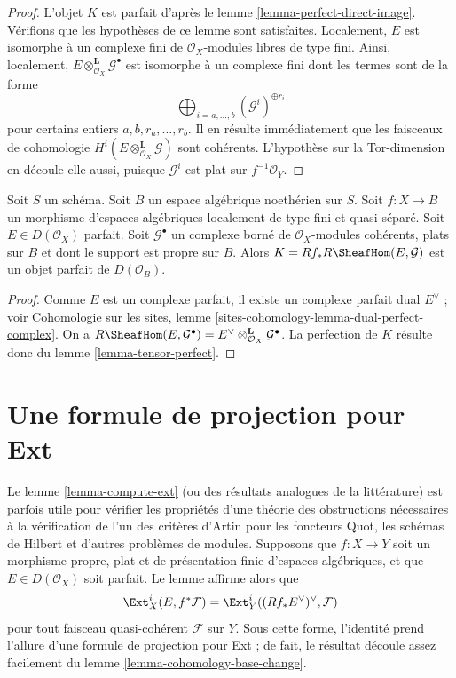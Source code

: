 \begin{proof}
L'objet $K$ est parfait d'apr\`es le lemme \ref{lemma-perfect-direct-image}.
V\'erifions que les hypoth\`eses de ce lemme sont satisfaites. Localement, $E$
est isomorphe \`a un complexe fini de $\mathcal{O}_X$-modules libres de type
fini. Ainsi, localement,
$E\otimes^\mathbf{L}_{\mathcal{O}_X}\mathcal{G}^\bullet$ est isomorphe \`a un
complexe fini dont les termes sont de la forme
$$
\bigoplus\nolimits_{i = a, \ldots, b} (\mathcal{G}^i)^{\oplus r_i}
$$
pour certains entiers $a,b,r_a,\ldots,r_b$. Il en r\'esulte imm\'ediatement que
les faisceaux de cohomologie
$H^i(E\otimes^\mathbf{L}_{\mathcal{O}_X}\mathcal{G})$ sont coh\'erents.
L'hypoth\`ese sur la Tor-dimension en d\'ecoule elle aussi, puisque
$\mathcal{G}^i$ est plat sur $f^{-1}\mathcal{O}_Y$.
\end{proof}

\begin{lemma}
\label{lemma-ext-perfect}
Soit $S$ un sch\'ema. Soit $B$ un espace alg\'ebrique noeth\'erien sur $S$.
Soit $f:X\to B$ un morphisme d'espaces alg\'ebriques localement de type fini
et quasi-s\'epar\'e. Soit $E\in D(\mathcal{O}_X)$ parfait. Soit
$\mathcal{G}^\bullet$ un complexe born\'e de $\mathcal{O}_X$-modules coh\'erents,
plats sur $B$ et dont le support est propre sur $B$. Alors
$K=Rf_*R\SheafHom(E,\mathcal{G})$ est un objet parfait de
$D(\mathcal{O}_B)$.
\end{lemma}

\begin{proof}
Comme $E$ est un complexe parfait, il existe un complexe parfait dual
$E^\vee$ ; voir Cohomologie sur les sites, lemme
\ref{sites-cohomology-lemma-dual-perfect-complex}. On a
$R\SheafHom(E,\mathcal{G}^\bullet)=
E^\vee\otimes^\mathbf{L}_{\mathcal{O}_X}\mathcal{G}^\bullet$.
La perfection de $K$ r\'esulte donc du lemme \ref{lemma-tensor-perfect}.
\end{proof}

\section{Une formule de projection pour Ext}
\label{section-ext}

\noindent
Le lemme \ref{lemma-compute-ext} (ou des r\'esultats analogues de la
litt\'erature) est parfois utile pour v\'erifier les propri\'et\'es d'une th\'eorie
des obstructions n\'ecessaires \`a la v\'erification de l'un des crit\`eres d'Artin
pour les foncteurs Quot, les sch\'emas de Hilbert et d'autres probl\`emes de
modules. Supposons que $f:X\to Y$ soit un morphisme propre, plat et de
pr\'esentation finie d'espaces alg\'ebriques, et que
$E\in D(\mathcal{O}_X)$ soit parfait. Le lemme affirme alors que
$$
\Ext^i_X(E, f^*\mathcal{F}) =
\Ext^i_Y((Rf_*E^\vee)^\vee, \mathcal{F})
$$
pour tout faisceau quasi-coh\'erent $\mathcal{F}$ sur $Y$. Sous cette forme,
l'identit\'e prend l'allure d'une formule de projection pour Ext ; de fait, le
r\'esultat d\'ecoule assez facilement du lemme \ref{lemma-cohomology-base-change}.

